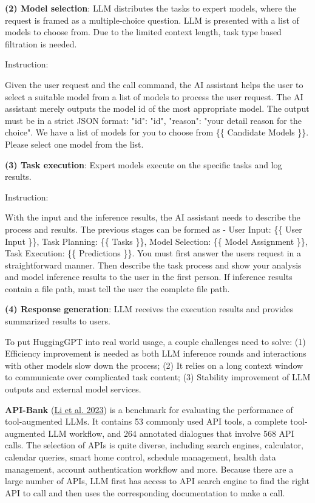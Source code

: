 \textbf{(2) Model selection}: LLM distributes the tasks to expert models, where the request is framed as a multiple-choice question. LLM is presented with a list of models to choose from. Due to the limited context length, task type based filtration is needed.

Instruction:

Given the user request and the call command, the AI assistant helps the user to select a suitable model from a list of models to process the user request. The AI assistant merely outputs the model id of the most appropriate model. The output must be in a strict JSON format: "id": "id", "reason": "your detail reason for the choice". We have a list of models for you to choose from \{\{ Candidate Models \}\}. Please select one model from the list.

\textbf{(3) Task execution}: Expert models execute on the specific tasks and log results.

Instruction:

With the input and the inference results, the AI assistant needs to describe the process and results. The previous stages can be formed as - User Input: \{\{ User Input \}\}, Task Planning: \{\{ Tasks \}\}, Model Selection: \{\{ Model Assignment \}\}, Task Execution: \{\{ Predictions \}\}. You must first answer the user\textquotesingle s request in a straightforward manner. Then describe the task process and show your analysis and model inference results to the user in the first person. If inference results contain a file path, must tell the user the complete file path.

\textbf{(4) Response generation}: LLM receives the execution results and provides summarized results to users.

To put HuggingGPT into real world usage, a couple challenges need to solve: (1) Efficiency improvement is needed as both LLM inference rounds and interactions with other models slow down the process; (2) It relies on a long context window to communicate over complicated task content; (3) Stability improvement of LLM outputs and external model services.

\textbf{API-Bank} (\href{https://arxiv.org/abs/2304.08244}{Li et al. 2023}) is a benchmark for evaluating the performance of tool-augmented LLMs. It contains 53 commonly used API tools, a complete tool-augmented LLM workflow, and 264 annotated dialogues that involve 568 API calls. The selection of APIs is quite diverse, including search engines, calculator, calendar queries, smart home control, schedule management, health data management, account authentication workflow and more. Because there are a large number of APIs, LLM first has access to API search engine to find the right API to call and then uses the corresponding documentation to make a call.

